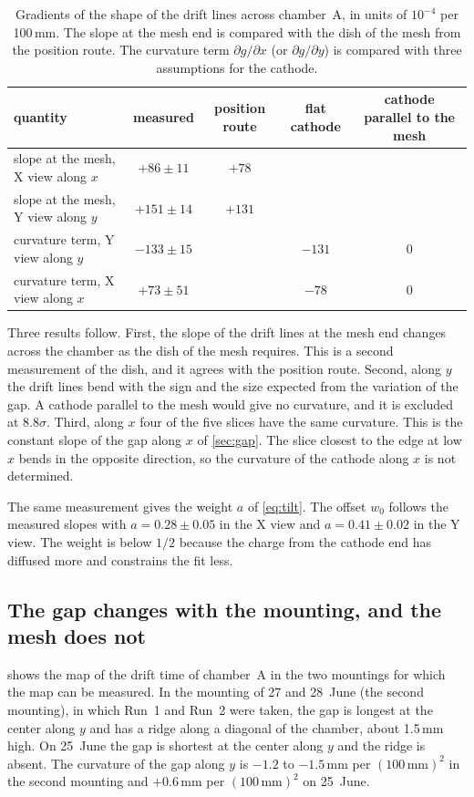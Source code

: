 \begin{table}[tbp]
  \centering
  \caption{Gradients of the shape of the drift lines across chamber~A, in units of $10^{-4}$ per 100\,mm. The slope
  at the mesh end is compared with the dish of the mesh from the position route. The curvature term
  $\partial g/\partial x$ (or $\partial g/\partial y$) is compared with three assumptions for the cathode.}
  \label{tab:driftlines}
  \small
  \begin{tabular}{lcccc}
    \hline
    quantity & measured & position route & flat cathode & cathode parallel to the mesh \\
    \hline
    slope at the mesh, X view along $x$ & $+86\pm11$ & $+78$ & & \\
    slope at the mesh, Y view along $y$ & $+151\pm14$ & $+131$ & & \\
    curvature term, Y view along $y$ & $-133\pm15$ & & $-131$ & 0 \\
    curvature term, X view along $x$ & $+73\pm51$ & & $-78$ & 0 \\
    \hline
  \end{tabular}
\end{table}

Three results follow. First, the slope of the drift lines at the mesh end changes across the chamber as the dish of
the mesh requires. This is a second measurement of the dish, and it agrees with the position route. Second, along $y$
the drift lines bend with the sign and the size expected from the variation of the gap. A cathode parallel to the mesh
would give no curvature, and it is excluded at $8.8\sigma$. Third, along $x$ four of the five slices have the same
curvature. This is the constant slope of the gap along $x$ of \cref{sec:gap}. The slice closest to the edge at low $x$
bends in the opposite direction, so the curvature of the cathode along $x$ is not determined.

The same measurement gives the weight $a$ of \cref{eq:tilt}. The offset $w_0$ follows the measured slopes with
$a=0.28\pm0.05$ in the X view and $a=0.41\pm0.02$ in the Y view. The weight is below $1/2$ because the charge from the
cathode end has diffused more and constrains the fit less.

\subsection{The gap changes with the mounting, and the mesh does not}
 shows the map of the drift time of chamber~A in the two mountings for which the map can be
measured. In the mounting of 27 and 28~June (the second mounting), in which Run~1 and Run~2 were taken, the gap is longest at the center
along $y$ and has a ridge along a diagonal of the chamber, about 1.5\,mm high. On 25~June the gap is shortest at the
center along $y$ and the ridge is absent. The curvature of the gap along $y$ is $-1.2$ to $-1.5$\,mm per
$(100\,\mathrm{mm})^2$ in the second mounting and $+0.6$\,mm per $(100\,\mathrm{mm})^2$ on 25~June.

